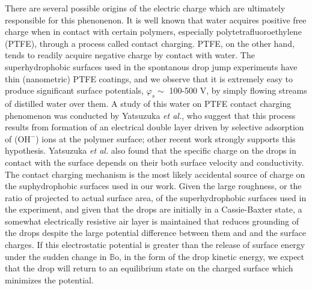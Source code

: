 \documentclass[12pt,a4paper,oneside]{book}
\begin{document}
There are several possible origins of the electric charge which are ultimately responsible for this phenonenon. It is well known that water acquires positive free charge when in contact with certain polymers, especially polytetrafluoroethylene (PTFE)\cite{langmuir_surface_1938}, through a process called contact charging. PTFE, on the other hand, tends to readily acquire negative charge by contact with water. The superhydrophobic surfaces used in the spontanous drop jump experiments have thin (nanometric) PTFE coatings, and we observe that it is extremely easy to produce significant surface potentials, $\varphi_s \sim$ 100-500 V, by simply flowing streams of distilled water over them. A study of this water on PTFE contact charging phenomenon was conducted by Yatsuzuka \emph{et al.}\cite{yatsuzuka_electrification_1994}, who suggest that this process results from formation of an electrical double layer driven by selective adsorption of ($\mbox{OH}^-$) ions at the polymer surface; other recent work strongly supports this hypothesis\cite{beattie_intrinsic_2006, strazdaite_water_2015}. Yatsuzuka \emph{et al.} also found that the specific charge on the drops in contact with the surface depends on their both surface velocity and conductivity. The contact charging mechanism is the most likely accidental source of charge on the suphydrophobic surfaces used in our work. Given the large roughness, or the ratio of projected to actual surface area, of the superhydrophobic surfaces used in the experiment, and given that the drops are initially in a Cassie-Baxter state, a somewhat electrically resistive air layer is maintained that reduces grounding of the drops despite the large potential difference between them and and the surface charges. If this electrostatic potential is greater than the release of surface energy under the sudden change in $\mathbb{B}\mbox{o}$, in the form of the drop kinetic energy, we expect that the drop will return to an equilibrium state on the charged surface which minimizes the potential.
\end{document}
